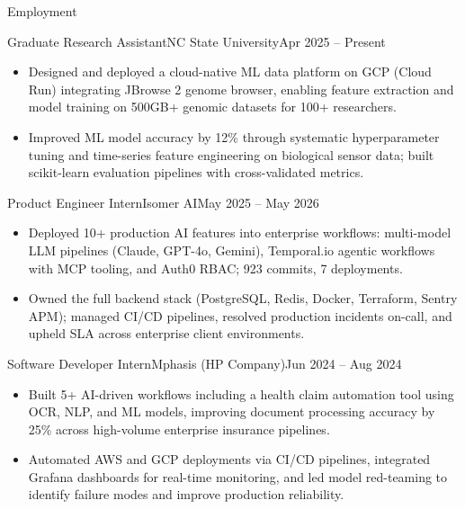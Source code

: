 \documentclass[]{mcdowellcv}
\begin{document}
\makeheader

\begin{cvsection}{Employment}
  \begin{cvsubsection}{Graduate Research Assistant}{NC State University}{Apr 2025 -- Present}
    \begin{itemize}
      \item Designed and deployed a cloud-native ML data platform on GCP (Cloud Run) integrating JBrowse 2 genome browser, enabling feature extraction and model training on 500GB+ genomic datasets for 100+ researchers.
      \item Improved ML model accuracy by 12\% through systematic hyperparameter tuning and time-series feature engineering on biological sensor data; built scikit-learn evaluation pipelines with cross-validated metrics.
    \end{itemize}
    \vspace{-1.5pt}
  \end{cvsubsection}

  \begin{cvsubsection}{Product Engineer Intern}{Isomer AI}{May 2025 -- May 2026}
    \begin{itemize}
      \item Deployed 10+ production AI features into enterprise workflows: multi-model LLM pipelines (Claude, GPT-4o, Gemini), Temporal.io agentic workflows with MCP tooling, and Auth0 RBAC; 923 commits, 7 deployments.
      \item Owned the full backend stack (PostgreSQL, Redis, Docker, Terraform, Sentry APM); managed CI/CD pipelines, resolved production incidents on-call, and upheld SLA across enterprise client environments.
    \end{itemize}
    \vspace{-1.5pt}
  \end{cvsubsection}

  \begin{cvsubsection}{Software Developer Intern}{Mphasis (HP Company)}{Jun 2024 -- Aug 2024}
    \begin{itemize}
      \item Built 5+ AI-driven workflows including a health claim automation tool using OCR, NLP, and ML models, improving document processing accuracy by 25\% across high-volume enterprise insurance pipelines.
      \item Automated AWS and GCP deployments via CI/CD pipelines, integrated Grafana dashboards for real-time monitoring, and led model red-teaming to identify failure modes and improve production reliability.
    \end{itemize}
    \vspace{-1.5pt}
  \end{cvsubsection}


\end{cvsection}
\end{document}
